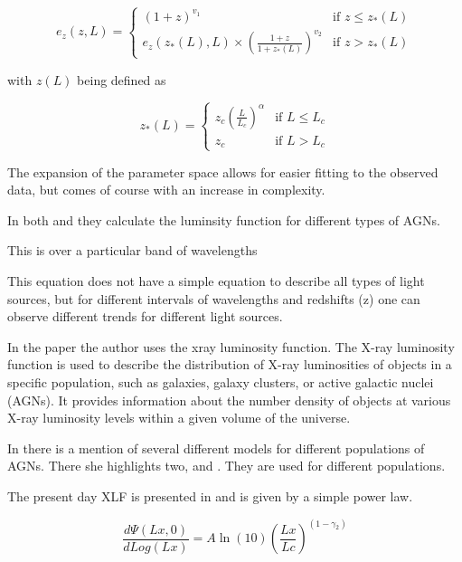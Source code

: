\documentclass{article}
\begin{document}
 \begin{equation}
    e_z(z, L) = 
    \begin{cases} 
    (1 + z)^{v_1} & \text{if } z \leq z_*(L) \\
    e_z(z_*(L), L) \times \left( \frac{1 + z}{1 + z_*(L)} \right)^{v_2} & \text{if } z >  z_*(L)
    \end{cases}
 \end{equation}

 with $z(L)$ being defined as

 \begin{equation}
    z_*(L) = 
    \begin{cases} 
    z_c \left( \frac{L}{L_c} \right)^\alpha & \text{if } L \leq L_c \\
    z_c & \text{if } L > L_c 
    \end{cases}
 \end{equation}


 The expansion of the parameter space allows for easier fitting to the observed data, but comes of course with an increase in complexity. 




In both \cite{Ajello_2009} and \cite{Ueda_2003} they calculate the luminsity function for different types of AGNs. 




This is over a particular band of wavelengths


This equation does not have a simple equation to describe all types of light sources, but for different intervals of wavelengths and redshifts (z) one can observe different trends for different light sources. 

In the paper \cite{Jacobsen:2015mga} the author uses the xray luminosity function. The X-ray luminosity function is used to describe the distribution of X-ray luminosities of objects in a specific population, such as galaxies, galaxy clusters, or active galactic nuclei (AGNs). It provides information about the number density of objects at various X-ray luminosity levels within a given volume of the universe.


In \cite{Jacobsen:2015mga} there is a mention of several different models for different populations of AGNs. There she highlights two, \cite{Ajello_2009} and \cite{Ueda_2003}. They are used for different populations.

The present day XLF is presented in \cite{Ajello_2009} and is given by a simple power law. 

\begin{equation}
    \frac{d\Psi(Lx,0)}{dLog(Lx)} = A\ln (10){(\frac{Lx}{Lc})}^{(1-\gamma_2)}
\end{equation}
\end{document}
